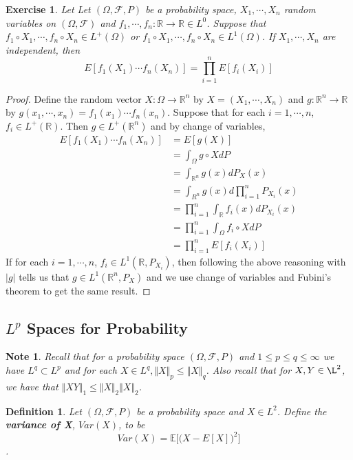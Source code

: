 \documentclass[12pt]{amsart}
\newtheorem{defn}[thm]{Definition}
\newtheorem{note}[thm]{Note}
\newtheorem{ex}[thm]{Exercise}
\newcommand{\Om}{\Omega}
\newcommand{\E}{\mathbb{E}}
\newcommand{\R}{\mathbb{R}}
\newcommand{\MF}{\mathcal{F}}
\newcommand{\n}{\Vert}
\begin{document}
\begin{ex}
Let Let $(\Om, \MF, P)$ be a probability space, $X_1, \cdots, X_n$ random variables on $(\Om, \MF)$ and $f_1, \cdots, f_n: \R \rightarrow \R \in L^0$. Suppose that $f_1 \circ X_1, \cdots, f_n \circ X_n\in L^+(\Om)$ or $f_1 \circ X_1, \cdots, f_n \circ X_n \in L^1(\Om)$. If $X_1, \cdots, X_n$ are independent, then $$E[f_1(X_1) \cdots f_n(X_n)] = \prod_{i=1}^n E[f_i(X_i)]$$
\end{ex}

\begin{proof}
Define the random vector $X : \Om \rightarrow \R^n$ by $X = (X_1, \cdots, X_n)$ and $g:\R^n \rightarrow \R$ by $g(x_1, \cdots, x_n) = f_1(x_1) \cdots f_n(x_n)$. Suppose that for each $i = 1, \cdots, n$, $f_i \in L^+(\R)$. Then $g \in L^+(\R^n)$ and by change of variables,  
\begin{align*}
E[f_1(X_1) \cdots f_n(X_n)] 
&= E[g(X)] \\
&= \int_{\Om} g \circ X dP \\
&= \int_{\R^n} g(x) dP_X(x) \\
&= \int_{R^n} g(x) d \prod\limits_{i=1}^nP_{X_i}(x) \\
&=  \prod_{i=1}^n \int_{\R}f_i(x) d P_{X_i}(x) \\ 
&= \prod_{i=1}^n \int_{\Om}f_i \circ X d P \\
&= \prod_{i=1}^n E[f_i(X_i)]
\end{align*}
If for each $i = 1, \cdots, n$, $f_i \in L^1(\R, P_{X_i})$, then following the above reasoning with $\vert g \vert $ tells us that $g \in L^1(\R^n, P_X)$ and we use change of variables and Fubini's theorem to get the same result.  
\end{proof}

\subsection{$L^p$ Spaces for Probability}

\begin{note}
Recall that for a probability space $(\Om, \MF, P)$ and $1 \leq p \leq q \leq \infty$ we have $L^q \subset L^p$ and for each $X \in L^q, \n X \n_p \leq  \n X\n_q$. Also recall that for $X,Y \in \L^2$, we have that $\n XY \n_1 \leq \n X\n_2 \n X\n_2$.
\end{note}

\begin{defn}
Let $(\Om, \MF, P)$ be a probability space and $X \in L^2$. Define the \textbf{variance of X}, $Var(X)$, to be $$Var(X) = \E\big[\big(X-E[X]\big)^2\big]$$.
\end{defn}
\end{document}
